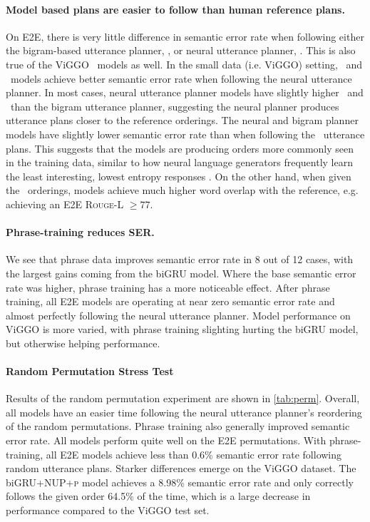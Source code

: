 \paragraph{Model based plans are easier to follow than human reference plans.
} On E2E, there is very little difference in semantic error rate when following either the
bigram-based utterance planner, \BgUP, or neural utterance planner,
\NUP. This is also true of the ViGGO \BART~models as well.  In the
small data (i.e. ViGGO) setting, \biGRU~and \Transformer~models achieve better semantic error rate when following the neural utterance planner.  In most cases,
neural utterance planner models have slightly higher \bleu~and \rougel~than
the bigram utterance planner, suggesting the neural planner produces utterance plans closer to
the reference orderings. The neural and bigram planner models have slightly lower semantic error rate
than when following the \Oracle~utterance plans.  This suggests that the models
are producing orders more commonly seen in the training data, similar to how
neural language generators frequently learn the least interesting, lowest
entropy responses \cite{serban2016}.  On the other hand, when given
the \Oracle~orderings, models achieve much higher word overlap with the
reference, e.g. achieving an E2E \textsc{Rouge-L} $\ge 77$.



\paragraph{Phrase-training reduces SER.} We see that phrase data improves semantic error rate
in 8 out of 12 cases, with the largest gains coming from the biGRU
 model.  Where the base semantic error rate was higher, phrase training has a more
noticeable effect. After phrase training, all E2E models are operating at near
zero semantic error rate and almost perfectly following the neural utterance planner. Model performance on ViGGO
is more varied, with phrase training slighting hurting the biGRU
 model, but otherwise helping performance.

\paragraph{Random Permutation Stress Test} Results of the random permutation
experiment are shown in \autoref{tab:perm}.  Overall, all models have an
easier time following the neural utterance planner's reordering of
the random
permutations. Phrase training also generally improved semantic error rate.  All models perform
quite well on the E2E permutations.  
With phrase-training,
all E2E models achieve less than 0.6\% semantic error rate following random 
utterance plans.
Starker differences emerge on the ViGGO dataset.  The biGRU\textsc{+NUP+p} model
achieves a 8.98\% semantic error rate and only correctly follows the given 
order 64.5\% of
the time, which is a large decrease in performance compared to the ViGGO test set.%

